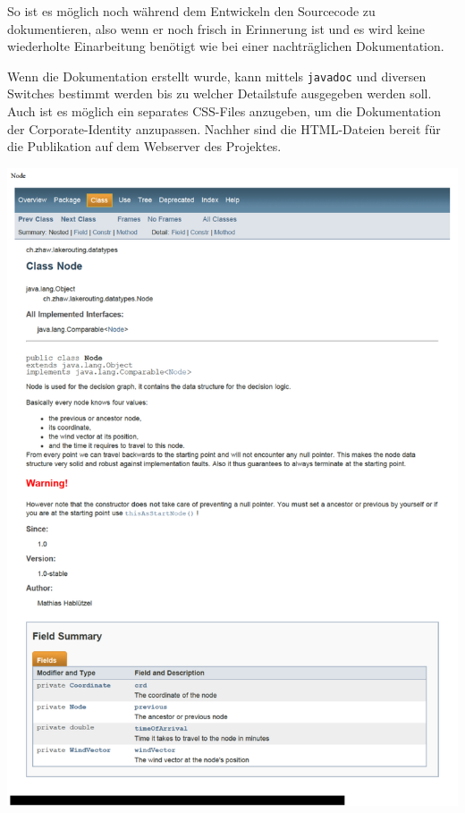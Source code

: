 \documentclass[a4paper,10pt]{article}
\begin{document}
So ist es möglich noch während dem Entwickeln den Sourcecode zu dokumentieren,
also wenn er noch frisch in Erinnerung ist und es wird keine wiederholte
Einarbeitung benötigt wie bei einer nachträglichen Dokumentation.

Wenn die Dokumentation erstellt wurde, kann mittels \texttt{javadoc} und
diversen Switches bestimmt werden bis zu welcher Detailstufe ausgegeben werden
soll. Auch ist es möglich ein separates CSS-Files anzugeben, um die
Dokumentation der Corporate-Identity anzupassen. Nachher sind die HTML-Dateien
bereit für die Publikation auf dem Webserver des Projektes.

\begin{center}
\begin{minipage}[c]{0.5\linewidth}
 \centering
 \includegraphics[width=\linewidth]{img/javadoc-screenshot.pdf}
\end{minipage}
\end{center}
\end{document}
